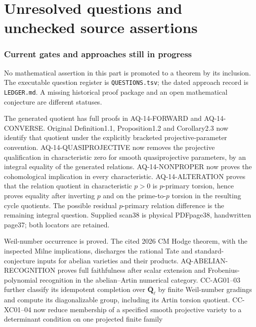 \clearpage
\part{Unresolved questions and unchecked source assertions}
\section{Current gates and approaches still in progress}
No mathematical assertion in this part is promoted to a theorem by
its inclusion. The executable question register is \texttt{QUESTIONS.tsv};
the dated approach record is \texttt{LEDGER.md}. A missing historical
proof package and an open mathematical conjecture are different statuses.

\begin{description}[style=nextline,leftmargin=0pt]
\item[Cote 14, scans 25--38: original quotient identification.]
The generated quotient has full proofs in AQ-14-FORWARD and
AQ-14-CONVERSE. Original Definition1.1, Proposition1.2 and
Corollary2.3 now identify that quotient under the explicitly bracketed
projective-parameter convention. AQ-14-QUASIPROJECTIVE now removes the projective qualification
in characteristic zero for smooth quasiprojective parameters, by an
integral equality of the generated relations. AQ-14-NONPROPER now
proves the cohomological implication in every characteristic.
AQ-14-ALTERATION proves that the relation quotient in characteristic
$p>0$ is $p$-primary torsion, hence proves equality after inverting $p$
and on the prime-to-$p$ torsion in the resulting cycle quotients.
The possible residual $p$-primary relation difference is the remaining
integral question. Supplied scan38 is physical PDFpage38,
handwritten page37; both locators are retained.
\item[Cote 15, scans 100--106: full simple-motive classification.]
Weil-number occurrence is proved. The cited 2026 CM Hodge theorem,
with the inspected Milne implications, discharges the rational Tate and
standard-conjecture inputs for abelian varieties and their products.
AQ-ABELIAN-RECOGNITION proves full faithfulness after scalar extension
and Frobenius-polynomial recognition in the abelian--Artin numerical
category. CC-AG01--03 further classify its idempotent completion over
$\overline{\mathbf Q}_\ell$ by finite Weil-number gradings and
compute its diagonalizable group, including its Artin torsion quotient. CC-XC01--04 now reduce membership of a specified smooth projective
variety to a determinant condition on one projected finite family

\end{description}
